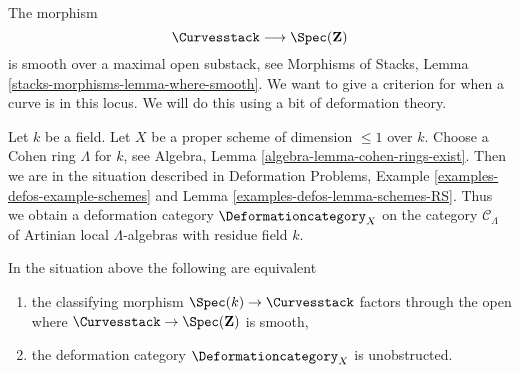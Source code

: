\noindent
The morphism
$$
\Curvesstack \longrightarrow \Spec(\mathbf{Z})
$$
is smooth over a maximal open substack, see
Morphisms of Stacks, Lemma \ref{stacks-morphisms-lemma-where-smooth}.
We want to give a criterion for when a curve is in this locus.
We will do this using a bit of deformation theory.

\medskip\noindent
Let $k$ be a field. Let $X$ be a proper scheme of dimension $\leq 1$ over $k$.
Choose a Cohen ring $\Lambda$ for $k$, see
Algebra, Lemma \ref{algebra-lemma-cohen-rings-exist}.
Then we are in the situation described in
Deformation Problems, Example \ref{examples-defos-example-schemes} and
Lemma \ref{examples-defos-lemma-schemes-RS}.
Thus we obtain a deformation category $\Deformationcategory_X$
on the category $\mathcal{C}_\Lambda$ of Artinian local
$\Lambda$-algebras with residue field $k$.

\begin{lemma}
\label{lemma-in-smooth-locus}
In the situation above the following are equivalent
\begin{enumerate}
\item the classifying morphism $\Spec(k) \to \Curvesstack$ factors
through the open where $\Curvesstack \to \Spec(\mathbf{Z})$ is smooth,
\item the deformation category $\Deformationcategory_X$ is unobstructed.
\end{enumerate}
\end{lemma}

